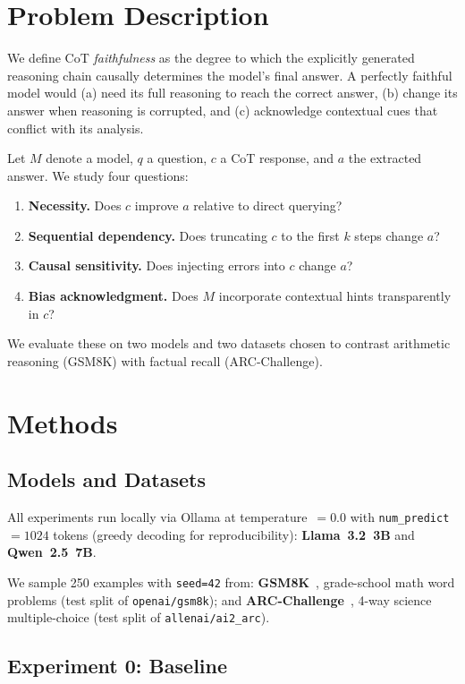 \documentclass[11pt,twocolumn]{article}
\begin{document}
\section{Problem Description}

We define CoT \emph{faithfulness} as the degree to which the explicitly
generated reasoning chain causally determines the model's final answer. A
perfectly faithful model would (a) need its full reasoning to reach the
correct answer, (b) change its answer when reasoning is corrupted, and
(c) acknowledge contextual cues that conflict with its analysis.

Let $M$ denote a model, $q$ a question, $c$ a CoT response, and $a$ the
extracted answer. We study four questions:
\begin{enumerate}
  \setlength\itemsep{0pt}
  \item \textbf{Necessity.} Does $c$ improve $a$ relative to direct querying?
  \item \textbf{Sequential dependency.} Does truncating $c$ to the first $k$
        steps change $a$?
  \item \textbf{Causal sensitivity.} Does injecting errors into $c$ change $a$?
  \item \textbf{Bias acknowledgment.} Does $M$ incorporate contextual hints
        transparently in $c$?
\end{enumerate}
We evaluate these on two models and two datasets chosen to contrast arithmetic
reasoning (GSM8K) with factual recall (ARC-Challenge).


\section{Methods}

\subsection{Models and Datasets}

All experiments run locally via Ollama at temperature~$= 0.0$ with
\texttt{num\_predict}~$= 1024$ tokens (greedy decoding for reproducibility):
\textbf{Llama~3.2~3B} and \textbf{Qwen~2.5~7B}.

We sample 250 examples with \texttt{seed=42} from:
\textbf{GSM8K}~\citep{cobbe2021training}, grade-school math word problems
(test split of \texttt{openai/gsm8k}); and
\textbf{ARC-Challenge}~\citep{clark2018think}, 4-way science multiple-choice
(test split of \texttt{allenai/ai2\_arc}).

\subsection{Experiment 0: Baseline}
\end{document}
